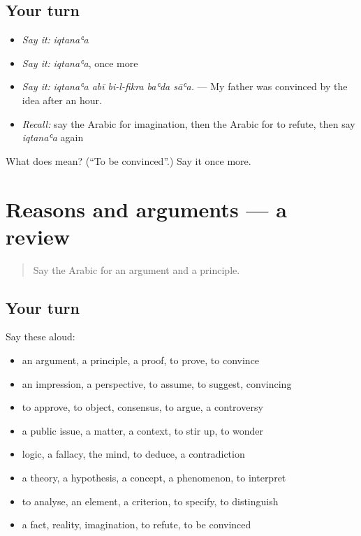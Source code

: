 \subsection*{Your turn}
\begin{itemize}
\raggedright
  \item \emph{Say it:} \emph{iqtanaʿa}
  \item \emph{Say it:} \emph{iqtanaʿa}, once more
  \item \emph{Say it:} \emph{iqtanaʿa abī bi-l-fikra baʿda sāʿa.} — My father was convinced by the idea after an hour.
  \item \emph{Recall:} say the Arabic for imagination, then the Arabic for to refute, then say \emph{iqtanaʿa} again
\end{itemize}

\begin{tcolorbox}[breakable,colback=teal!4,colframe=teal!35!black,title={Before you move on}]
What does  mean? (\textquotedblleft{}To be convinced\textquotedblright{}.) Say it once more.
\end{tcolorbox}
\section[(dialogue)]{Reasons and arguments — a review}

\label{lesson:AR-R365-review-358-365}



\begin{quote}
Say the Arabic for an argument and a principle.
\end{quote}

\subsection*{Your turn}
Say these aloud:

\begin{itemize}
\raggedright
  \item an argument, a principle, a proof, to prove, to convince
  \item an impression, a perspective, to assume, to suggest, convincing
  \item to approve, to object, consensus, to argue, a controversy
  \item a public issue, a matter, a context, to stir up, to wonder
  \item logic, a fallacy, the mind, to deduce, a contradiction
  \item a theory, a hypothesis, a concept, a phenomenon, to interpret
  \item to analyse, an element, a criterion, to specify, to distinguish
  \item a fact, reality, imagination, to refute, to be convinced
\end{itemize}

